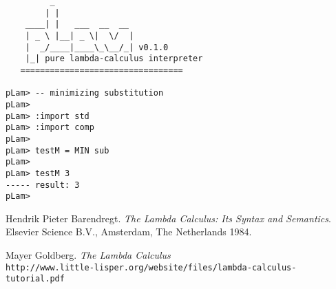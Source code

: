 \documentclass[a4paper,12pt]{article}
\begin{document}
\begin{lstlisting}
         _
        | |
    ____| |   ___  __  __
    | _ \ |__| _ \|  \/  |
    |  _/____|____\_\__/_| v0.1.0
    |_| pure lambda-calculus interpreter
   =================================

pLam> -- minimizing substitution
pLam>
pLam> :import std
pLam> :import comp
pLam> 
pLam> testM = MIN sub
pLam> 
pLam> testM 3
----- result: 3
pLam> 

\end{lstlisting}





	
	


\newpage

\begin{thebibliography}{9}
Hendrik Pieter Barendregt.
\textit{The Lambda Calculus: Its Syntax and Semantics}. 
Elsevier Science B.V., Amsterdam, The Netherlands 1984.
  
Mayer Goldberg.
\textit{The Lambda Calculus}
\\\texttt{http://www.little-lisper.org/website/files/lambda-calculus-tutorial.pdf}
\end{thebibliography}


 
\end{document}
